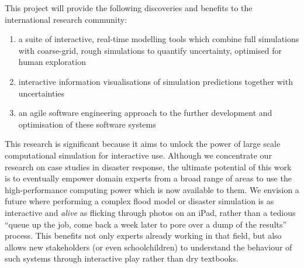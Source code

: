 \documentclass[a4paper,fontsize=12pt]{scrartcl}
\begin{document}
This project will provide the following discoveries and benefits to
the international research community:
\begin{enumerate}

\item a suite of interactive, real-time modelling tools which combine
full simulations with coarse-grid, rough simulations to quantify
uncertainty, optimised for human exploration

\item interactive information visualisations of simulation predictions
together with uncertainties



\item an agile software engineering approach to the further development
and optimisation of these software systems

\end{enumerate}

This research is significant because it aims to unlock the power of
large scale 
computational simulation for interactive use. Although we concentrate
our research on case studies in disaster response, the
ultimate potential of this work is to eventually empower domain
experts from a broad range of areas to use the high-performance
computing power which is now available to them. We envision a future
where performing a complex flood model or disaster simulation is as
interactive and \emph{alive} as flicking through photos on an iPad,
rather than a tedious ``queue up the job, come back a week later to
pore over a dump of the results'' process. This benefits not only
experts already working in that field, but also allows new stakeholders
(or even schoolchildren) to understand the behaviour of such systems
through interactive play rather than dry textbooks.

\end{document}
